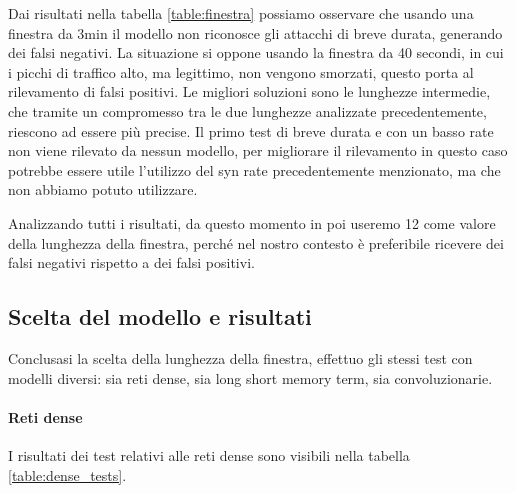 Dai risultati nella tabella \ref{table:finestra} possiamo osservare che usando una finestra da 3min il modello non riconosce gli attacchi di breve durata, generando dei falsi negativi. La situazione si oppone usando la finestra da 40 secondi, in cui i picchi di traffico alto, ma legittimo, non vengono smorzati, questo porta al rilevamento di falsi positivi. Le migliori soluzioni sono le lunghezze intermedie, che tramite un compromesso tra le due lunghezze analizzate precedentemente, riescono ad essere più precise.
Il primo test di breve durata e con un basso rate non viene rilevato da nessun modello, per migliorare il rilevamento in questo caso potrebbe essere utile l'utilizzo del syn rate precedentemente menzionato, ma che non abbiamo potuto utilizzare.

Analizzando tutti i risultati, da questo momento in poi useremo 12 come valore della lunghezza della finestra, perché nel nostro contesto è preferibile ricevere dei falsi negativi rispetto a dei falsi positivi.


\subsection{Scelta del modello e risultati}

Conclusasi la scelta della lunghezza della finestra, effettuo gli stessi test con modelli diversi: sia reti dense, sia long short memory term, sia convoluzionarie.

\paragraph{Reti dense} I risultati dei test relativi alle reti dense sono visibili nella tabella \ref{table:dense_tests}.


